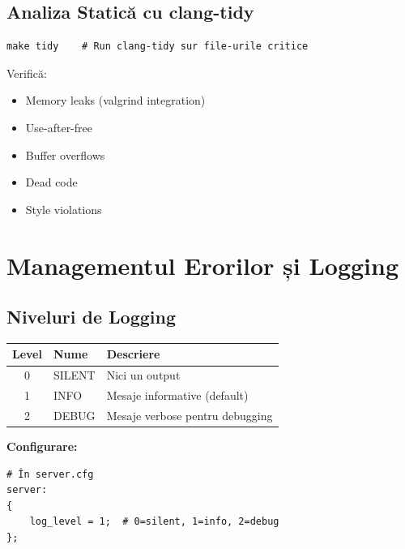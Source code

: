 \documentclass[12pt,a4paper,twoside]{article}
\begin{document}
\begin{itemize}
\subsection{Analiza Statică cu clang-tidy}

\begin{lstlisting}
make tidy    # Run clang-tidy sur file-urile critice
\end{lstlisting}

Verifică:
\begin{itemize}
    \item Memory leaks (valgrind integration)
    \item Use-after-free
    \item Buffer overflows
    \item Dead code
    \item Style violations
\end{itemize}

\section{Managementul Erorilor și Logging}

\subsection{Niveluri de Logging}

\begin{table}[H]
    \centering
    \begin{tabular}{|c|l|l|}
        \toprule
        \textbf{Level} & \textbf{Nume} & \textbf{Descriere} \\
        \midrule
        0 & SILENT & Nici un output \\
        1 & INFO & Mesaje informative (default) \\
        2 & DEBUG & Mesaje verbose pentru debugging \\
        \bottomrule
    \end{tabular}
\end{table}

\textbf{Configurare:}

\begin{lstlisting}
# În server.cfg
server:
{
    log_level = 1;  # 0=silent, 1=info, 2=debug
};
\end{lstlisting}


\end{itemize}
\end{document}
